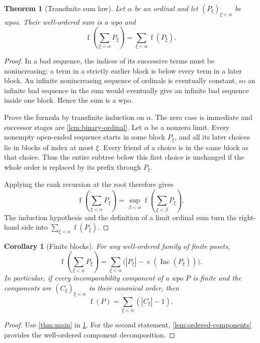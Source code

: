\documentclass[11pt,letterpaper]{article}
\newtheorem{theorem}{Theorem}[section]
\newtheorem{corollary}[corollary]{Corollary}
\theoremstyle{definition}
\theoremstyle{remark}
\newcommand{\fot}{\operatorname{f}}
\newcommand{\Inc}{\operatorname{Inc}}
\newcommand{\cc}{\operatorname{c}}
\begin{document}
\begin{theorem}[Transfinite sum law]\label{thm:transfinite}
Let $\alpha$ be an ordinal and let $(P_\xi)_{\xi<\alpha}$ be wpos. Their
well-ordered sum is a wpo and
\begin{equation}\label{eq:transfinite}
 \boxed{\fot\left(\sum_{\xi<\alpha}P_\xi\right)
       =\sum_{\xi<\alpha}\fot(P_\xi).}
\end{equation}
\end{theorem}
\begin{proof}
In a bad sequence, the indices of its successive terms must be nonincreasing:
a term in a strictly earlier block is below every term in a later block.
An infinite nonincreasing sequence of ordinals is eventually constant, so
an infinite bad sequence in the sum would eventually give an infinite bad
sequence inside one block. Hence the sum is a wpo.

Prove the formula by transfinite induction on $\alpha$. The zero case is
immediate and successor stages are \cref{lem:binary-ordinal}. Let $\alpha$
be a nonzero limit. Every nonempty open-ended sequence starts in some block
$P_\xi$, and all its later choices lie in blocks of index at most $\xi$.
Every friend of a choice is in the same block as that choice. Thus the
entire subtree below this first choice is unchanged if the whole order is
replaced by its prefix through $P_\xi$.

Applying the rank recursion at the root therefore gives
\[
 \fot\left(\sum_{\xi<\alpha}P_\xi\right)
 =\sup_{\beta<\alpha}\fot\left(\sum_{\xi<\beta}P_\xi\right).
\]
The induction hypothesis and the definition of a limit ordinal sum turn
the right-hand side into $\sum_{\xi<\alpha}\fot(P_\xi)$.
\end{proof}

\begin{corollary}[Finite blocks]\label{cor:finite-blocks}
For any well-ordered family of finite posets,
\begin{equation}\label{eq:finite-blocks}
 \fot\left(\sum_{\xi<\alpha}P_\xi\right)
 =\sum_{\xi<\alpha}\bigl(|P_\xi|-\cc(\Inc(P_\xi))\bigr).
\end{equation}
In particular, if every incomparability component of a wpo $P$ is finite
and the components are $(C_\xi)_{\xi<\alpha}$ in their canonical order,
then
\begin{equation}\label{eq:finite-components-infinite}
 \fot(P)=\sum_{\xi<\alpha}(|C_\xi|-1).
\end{equation}
\end{corollary}
\begin{proof}
Use \cref{thm:main} in \cref{thm:transfinite}. For the second statement,
\cref{lem:ordered-components} provides the well-ordered component decomposition.
\end{proof}
\end{document}
